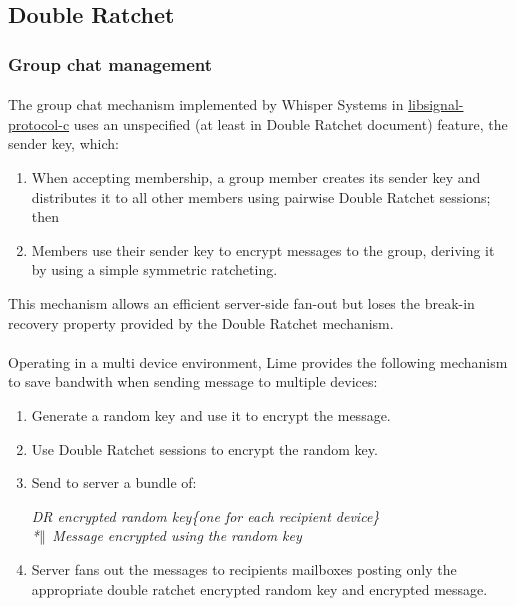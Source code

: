 \documentclass[a4paper,11pt]{article}
\begin{document}
  \subsection{Double Ratchet}
  \subsubsection{Group chat management}
    \label{subsubsec:groupchat}
    \paragraph*{}The group chat mechanism implemented by Whisper Systems in \href{https://github.com/WhisperSystems/libsignal-protocol-c}{libsignal-protocol-c}\cite{libsignal} uses an unspecified (at least in Double Ratchet document\cite{doubleRatchet}) feature, the sender key, which:
    \begin{enumerate}
      \item When accepting membership, a group member creates its sender key and distributes it to all other members using pairwise Double Ratchet sessions; then
      \item Members use their sender key to encrypt messages to the group, deriving it by using a simple symmetric ratcheting.
    \end{enumerate}
    This mechanism allows an efficient server-side fan-out but loses the break-in recovery property provided by the Double Ratchet mechanism.
    
    \paragraph*{}Operating in a multi device environment, Lime provides the following mechanism to save bandwith when sending message to multiple devices:
    \begin{enumerate}
      \item Generate a random key and use it to encrypt the message.
      \item Use Double Ratchet sessions to encrypt the random key.
      \item Send to server a bundle of:
        \begin{center}
          \textit{DR encrypted random key\{one for each recipient device\}\\*$\Arrowvert$ Message encrypted using the random key}
        \end{center}
      \item Server fans out the messages to recipients mailboxes posting only the appropriate double ratchet encrypted random key and encrypted message.
    \end{enumerate}
\end{document}
